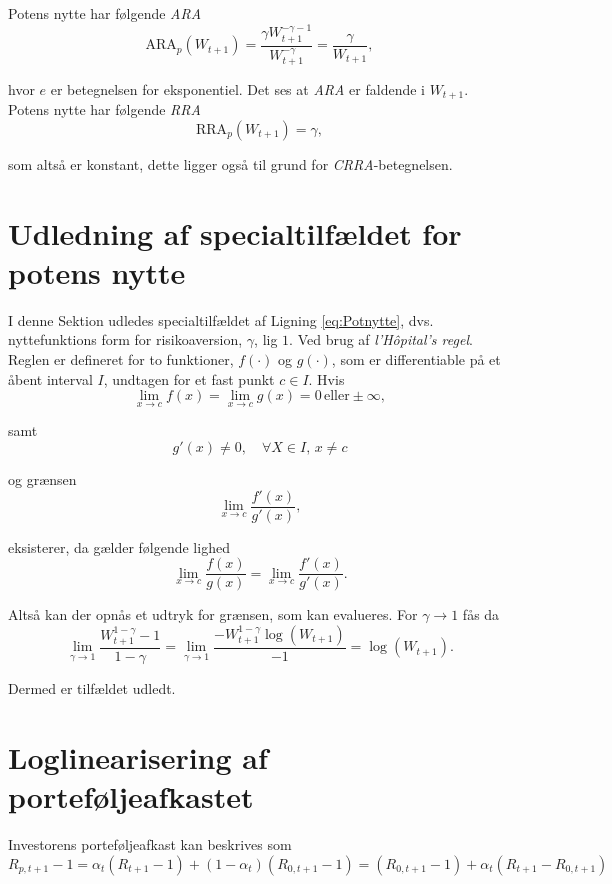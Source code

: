 \documentclass[
  a4paper,
  oneside]{memoir}
\begin{document}
Potens nytte har følgende \emph{ARA}
\[\text{ARA}_p(W_{t+1})= \frac{\gamma W_{t+1}^{-\gamma-1}}{W_{t+1}^{-\gamma}}=\frac{\gamma}{W_{t+1}},\]

hvor \(e\) er betegnelsen for eksponentiel. Det ses at \emph{ARA} er faldende i \(W_{t+1}\). Potens nytte har følgende \emph{RRA}
\[\text{RRA}_p(W_{t+1})= \gamma,\]

som altså er konstant, dette ligger også til grund for \emph{CRRA}-betegnelsen.

\hypertarget{udledning-af-specialtilfuxe6ldet-for-potens-nytte}{%
\section{Udledning af specialtilfældet for potens nytte}\label{udledning-af-specialtilfuxe6ldet-for-potens-nytte}}

I denne Sektion udledes specialtilfældet af Ligning \eqref{eq:Potnytte}, dvs. nyttefunktions form for risikoaversion, \(\gamma\), lig \(1\). Ved brug af \emph{l'Hôpital's regel}. Reglen er defineret for to funktioner, \(f(\cdot)\) og \(g(\cdot)\), som er differentiable på et åbent interval \(I\), undtagen for et fast punkt \(c\in I\). Hvis
\[\lim_{x\to c} f(x)=\lim_{x\to c}g(x)=0\,\text{eller} \pm \infty,\]

samt
\[g'(x)\neq 0,\quad \forall X\in I,\,x\neq c\]

og grænsen
\[\lim_{x\to c} \frac{f'(x)}{g'(x)},\]

eksisterer, da gælder følgende lighed
\[\lim_{x\to c}\frac{f(x)}{g(x)}=\lim_{x\to c}\frac{f'(x)}{g'(x)}.\]

Altså kan der opnås et udtryk for grænsen, som kan evalueres. For \(\gamma\rightarrow 1\) fås da
\[\lim_{\gamma\to 1}\frac{W_{t+1}^{1-\gamma}-1}{1-\gamma}=\lim_{\gamma\to 1}\frac{-W_{t+1}^{1-\gamma}\log\left(W_{t+1}\right)}{-1}=\log\left(W_{t+1}\right).\]

Dermed er tilfældet udledt.

\hypertarget{loglinearisering-af-portefuxf8ljeafkastet}{%
\section{Loglinearisering af porteføljeafkastet}\label{loglinearisering-af-portefuxf8ljeafkastet}}

Investorens porteføljeafkast kan beskrives som
\begin{equation}
R_{p,t+1}-1 = \alpha_t(R_{t+1}- 1) + (1-\alpha_t)(R_{0,t+1}-1)=(R_{0,t+1} -1) + \alpha_t (R_{t+1} - R_{0,t+1}) \label{eq:logl1}
\end{equation}
\end{document}
